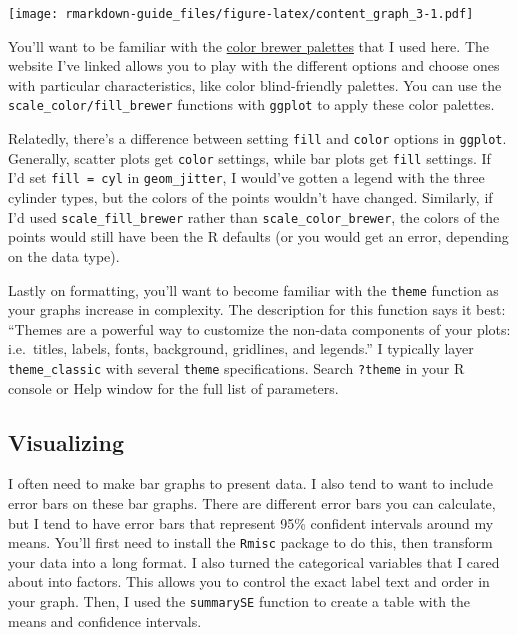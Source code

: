 \documentclass[
]{book}
\begin{document}
\texttt{[image: rmarkdown-guide\_files/figure-latex/content\_graph\_3-1.pdf]}

You'll want to be familiar with the \href{https://colorbrewer2.org/}{color brewer palettes} that I used here. The website I've linked allows you to play with the different options and choose ones with particular characteristics, like color blind-friendly palettes. You can use the \texttt{scale\_color/fill\_brewer} functions with \texttt{ggplot} to apply these color palettes.

Relatedly, there's a difference between setting \texttt{fill} and \texttt{color} options in \texttt{ggplot}. Generally, scatter plots get \texttt{color} settings, while bar plots get \texttt{fill} settings. If I'd set \texttt{fill\ =\ cyl} in \texttt{geom\_jitter}, I would've gotten a legend with the three cylinder types, but the colors of the points wouldn't have changed. Similarly, if I'd used \texttt{scale\_fill\_brewer} rather than \texttt{scale\_color\_brewer}, the colors of the points would still have been the R defaults (or you would get an error, depending on the data type).

Lastly on formatting, you'll want to become familiar with the \texttt{theme} function as your graphs increase in complexity. The description for this function says it best: ``Themes are a powerful way to customize the non-data components of your plots: i.e.~titles, labels, fonts, background, gridlines, and legends.'' I typically layer \texttt{theme\_classic} with several \texttt{theme} specifications. Search \texttt{?theme} in your R console or Help window for the full list of parameters.

\hypertarget{visualizing}{%
\subsection{Visualizing}\label{visualizing}}

I often need to make bar graphs to present data. I also tend to want to include error bars on these bar graphs. There are different error bars you can calculate, but I tend to have error bars that represent 95\% confident intervals around my means. You'll first need to install the \texttt{Rmisc} package to do this, then transform your data into a long format. I also turned the categorical variables that I cared about into factors. This allows you to control the exact label text and order in your graph. Then, I used the \texttt{summarySE} function to create a table with the means and confidence intervals.
\end{document}
